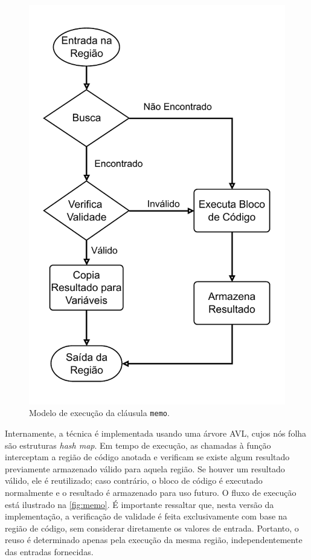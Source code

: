 \begin{figure}[htb]
    \centering
    \includegraphics[scale=0.5]{figuras/memo.pdf}
    \caption{Modelo de execução da cláusula \texttt{memo}.}
    \label{fig:memo}
\end{figure}

Internamente, a técnica é implementada usando uma árvore AVL, cujos nós folha são estruturas \textit{hash map}. Em tempo de execução, as chamadas à função interceptam a região de código anotada e verificam se existe algum resultado previamente armazenado válido para aquela região. Se houver um resultado válido, ele é reutilizado; caso contrário, o bloco de código é executado normalmente e o resultado é armazenado para uso futuro. O fluxo de execução está ilustrado na \autoref{fig:memo}. É importante ressaltar que, nesta versão da implementação, a verificação de validade é feita exclusivamente com base na região de código, sem considerar diretamente os valores de entrada. Portanto, o reuso é determinado apenas pela execução da mesma região, independentemente das entradas fornecidas.

